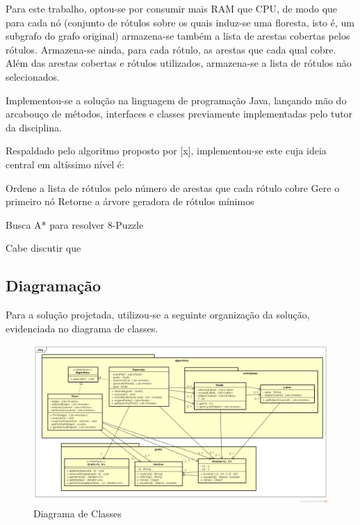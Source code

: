 \documentclass[12pt]{article}
\begin{document}
		Para este trabalho, optou-se por consumir mais RAM que CPU, de modo que para cada nó (conjunto de rótulos sobre os quais induz-se uma floresta, isto é, um subgrafo do grafo original) armazena-se também a lista de arestas cobertas pelos rótulos. Armazena-se ainda, para cada rótulo, as arestas que cada qual cobre. Além das arestas cobertas e rótulos utilizados, armazena-se a lista de rótulos não selecionados.

		Implementou-se a solução na linguagem de programação Java, lançando mão do arcabouço de métodos, interfaces e classes previamente implementadas pelo tutor da disciplina.

		Respaldado pelo algoritmo proposto por [x], implementou-se este cuja ideia central em altíssimo nível é:

		\begin{algorithm}[H]
			\SetAlgoLined
			Ordene a lista de rótulos pelo número de arestas que cada rótulo cobre\;
			Gere o primeiro nó\;
			Retorne a árvore geradora de rótulos mínimos\;
			\caption{Busca A* para resolver 8-Puzzle}
		\end{algorithm}

		Cabe discutir que

	\subsection{Diagramação}\label{sec:diagramacao}

		Para a solução projetada, utilizou-se a seguinte organização da solução, evidenciada no diagrama de classes.

		\begin{landscape}
		\centering
		\begin{figure}[p]
		\includegraphics[width=1.4\textwidth]{ClassDiagram.png}
		\caption{Diagrama de Classes}
		\label{fig:classDiagram}
		\end{figure}
		\end{landscape}
		\restoregeometry
\end{document}
